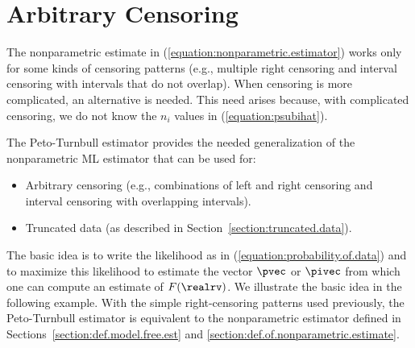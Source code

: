 
\section{Arbitrary Censoring}
\label{section:arbitrary.censoring}
The nonparametric estimate in
(\ref{equation:nonparametric.estimator}) works only for some kinds of
censoring patterns (e.g., multiple right censoring and interval
censoring with intervals that do not overlap).  When censoring is
more complicated, an alternative is needed. 
This need arises because, with complicated censoring, we do not know
the $n_{i}$ values in (\ref{equation:psubihat}).

The Peto-Turnbull estimator provides the needed generalization of
the nonparametric ML estimator that can be used for: \begin{itemize}
\item
Arbitrary censoring (e.g., combinations of left and right censoring
and interval censoring with overlapping intervals).
\item
Truncated data (as described in Section~\ref{section:truncated.data}).
\end{itemize} The basic idea is to write the likelihood as in
(\ref{equation:probability.of.data}) and to maximize this likelihood
to estimate the vector $\pvec$ or $\pivec$ from which one can compute
an estimate of $F(\realrv)$.  We illustrate the basic idea in the
following example. With the simple right-censoring patterns used
previously, the Peto-Turnbull estimator is equivalent to the 
nonparametric estimator defined in 
Sections~\ref{section:def.model.free.est}
and \ref{section:def.of.nonparametric.estimate}.

